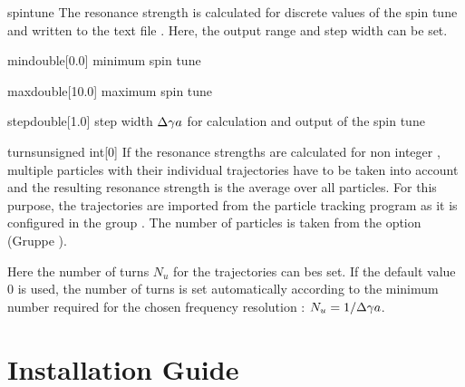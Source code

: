 \documentclass[a4paper]{scrartcl}
\begin{document}
\begin{configdocgroup}{spintune}
  The resonance strength is calculated for discrete values of the spin tune \ga and
  written to the text file . Here, the output range and
  step width can be set.

  \begin{configdoc}{min}{double}{}[0.0]
    minimum spin tune \ga
  \end{configdoc}

  \begin{configdoc}{max}{double}{}[10.0]
    maximum spin tune \ga
  \end{configdoc}

  \begin{configdoc}{step}{double}{}[1.0]
    step width $\Delta\gamma a$ for calculation and output of the spin tune
  \end{configdoc}
\end{configdocgroup}

\begin{configdoc}{turns}{unsigned int}{}[0]
  If the resonance strengths are calculated for non integer \ga, multiple particles with
  their individual trajectories have to be taken into account and the resulting resonance
  strength is the average over all particles. For this purpose, the trajectories are
  imported from the particle tracking program as it is configured in the group
  . The number of particles is taken from the option
   (Gruppe ).

  Here the number of turns $N_u$ for the trajectories can bes set. If the default value 0
  is used, the number of turns is set automatically according to the minimum number
  required for the chosen frequency resolution : $N_u = 1/\Delta\gamma a$.
\end{configdoc}



\clearpage
\appendix

\section{\ele Installation Guide}
\label{sec:ele-install}



\printbibliography[heading=bibintoc]
\end{document}
